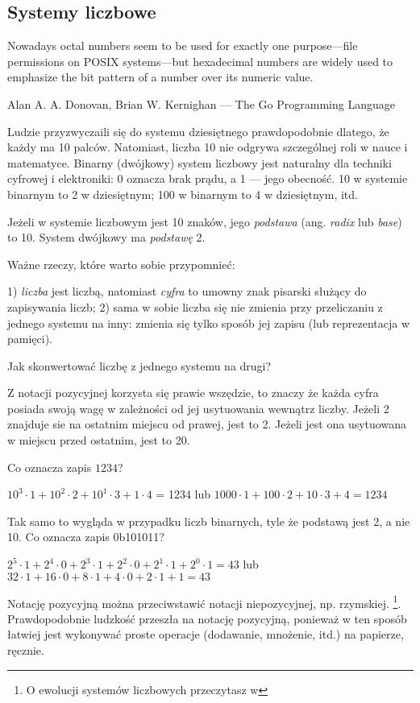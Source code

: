 \subsection{Systemy liczbowe}

\epigraph{Nowadays octal numbers seem to be
used for exactly one purpose---file permissions on POSIX systems---but hexadecimal numbers
are widely used to emphasize the bit pattern of a number over its numeric value.}
{Alan A. A. Donovan, Brian W. Kernighan ---  The Go Programming Language}

Ludzie przyzwyczaili się do systemu dziesiętnego prawdopodobnie dlatego, że każdy ma 10 palców.
Natomiast, liczba 10 nie odgrywa szczególnej roli w nauce i matematyce.
Binarny (dwójkowy) system liczbowy jest naturalny dla techniki cyfrowej i elektroniki: 0 oznacza brak prądu, a 1 --- jego obecność.
10 w systemie binarnym to 2 w dziesiętnym; 100 w binarnym to 4 w dziesiętnym, itd.

Jeżeli w systemie liczbowym jest 10 znaków, jego \emph{podstawa} (ang. \emph{radix} lub \emph{base}) to 10.
System dwójkowy ma \emph{podstawę} 2.

Ważne rzeczy, które warto sobie przypomnieć:

1) \emph{liczba} jest liczbą, natomiast \emph{cyfra} to umowny znak pisarski służący do zapisywania liczb;
2) sama w sobie liczba się nie zmienia przy przeliczaniu z jednego systemu na inny: zmienia się tylko sposób jej zapisu (lub reprezentacja w pamięci).

Jak skonwertować liczbę z jednego systemu na drugi?

Z notacji pozycyjnej korzysta się prawie wszędzie, to znaczy że każda cyfra posiada swoją wagę w zależności od jej usytuowania wewnątrz liczby.
Jeżeli 2 znajduje sie na ostatnim miejscu od prawej, jest to 2.
Jeżeli jest ona usytuowana w miejscu przed ostatnim, jest to 20.

Co oznacza zapis $1234$?

$10^3 \cdot 1 + 10^2 \cdot 2 + 10^1 \cdot 3 + 1 \cdot 4$ = 1234 lub
$1000 \cdot 1 + 100 \cdot 2 + 10 \cdot 3 + 4 = 1234$

Tak samo to wygląda w przypadku liczb binarnych, tyle że podstawą jest 2, a nie 10.
Co oznacza zapis 0b101011?

$2^5 \cdot 1 + 2^4 \cdot 0 + 2^3 \cdot 1 + 2^2 \cdot 0 + 2^1 \cdot 1 + 2^0 \cdot 1 = 43$ lub
$32 \cdot 1 + 16 \cdot 0 + 8 \cdot 1 + 4 \cdot 0 + 2 \cdot 1 + 1 = 43$

Notację pozycyjną można przeciwstawić notacji niepozycyjnej, np. rzymskiej.
\footnote{O ewolucji systemów liczbowych przeczytasz w }.
Prawdopodobnie ludzkość przeszła na notację pozycyjną, ponieważ w ten sposób łatwiej jest wykonywać proste operacje (dodawanie, mnożenie, itd.) na papierze, ręcznie.

